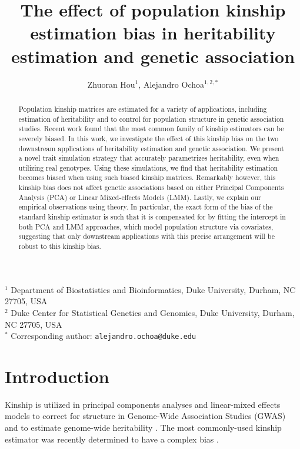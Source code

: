 \documentclass[11pt]{article}
\title{\Large \textbf{The effect of population kinship estimation bias in heritability estimation and genetic association}}
\author{Zhuoran Hou$^1$, Alejandro Ochoa$^{1,2,*}$}
\date{}
\begin{document}
\maketitle

\noindent
$^1$ Department of Biostatistics and Bioinformatics, Duke University, Durham, NC 27705, USA \\
$^2$ Duke Center for Statistical Genetics and Genomics, Duke University, Durham, NC 27705, USA \\
$^*$ Corresponding author: \texttt{alejandro.ochoa@duke.edu}


\begin{abstract}
  Population kinship matrices are estimated for a variety of applications, including estimation of heritability and to control for population structure in genetic association studies.
  Recent work found that the most common family of kinship estimators can be severely biased.
  In this work, we investigate the effect of this kinship bias on the two downstream applications of heritability estimation and genetic association.
  We present a novel trait simulation strategy that accurately parametrizes heritability, even when utilizing real genotypes.
  Using these simulations, we find that heritability estimation becomes biased when using such biased kinship matrices.
  Remarkably however, this kinship bias does not affect genetic associations based on either Principal Components Analysis (PCA) or Linear Mixed-effects Models (LMM).
  Lastly, we explain our empirical observations using theory.
  In particular, the exact form of the bias of the standard kinship estimator is such that it is compensated for by fitting the intercept in both PCA and LMM approaches, which model population structure via covariates, suggesting that only downstream applications with this precise arrangement will be robust to this kinship bias.
\end{abstract}



\clearpage
	
\section{Introduction}

Kinship is utilized in principal components analyses and linear-mixed effects models to correct for structure in Genome-Wide Association Studies (GWAS) \citep{xie_combining_1998,yu_unified_2006, aulchenko_genomewide_2007, price_principal_2006, astle_population_2009,kang_efficient_2008, kang_variance_2010, zhou_genome-wide_2012, loh_efficient_2015, sul_population_2018} and to estimate genome-wide heritability \citep{yang_common_2010, yang_gcta:_2011, speed_improved_2012}.
The most commonly-used kinship estimator \citep{price_principal_2006, astle_population_2009, rakovski_kinship-based_2009, thornton_roadtrips:_2010, yang_common_2010, yang_gcta:_2011, zhou_genome-wide_2012, speed_improved_2012, speed_relatedness_2015, loh_efficient_2015, wang_efficient_2017, sul_population_2018} was recently determined to have a complex bias \citep{ochoa_fst2, weir_unified_2017}.
\end{document}
